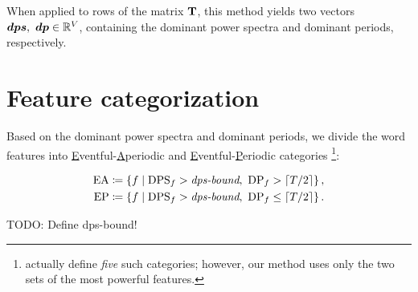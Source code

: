 When applied to rows of the matrix $\mathbf{T}$, this method yields two vectors $\vect{DPS},\ \vect{DP} \in \R^{\featcount}$, containing the dominant power spectra and dominant periods, respectively.


\section{Feature categorization}
Based on the dominant power spectra and dominant periods, we divide the word features into \underline{E}ventful-\underline{A}periodic and \underline{E}ventful-\underline{P}eriodic categories \footnote{\cite{event-detection} actually define \textit{five} such categories; however, our method uses only the two sets of the most powerful features.}:

\begin{equation}
\begin{split}
	\text{EA} \coloneqq \left\{ f \mid \text{DPS}_{f} > \textit{dps-bound},\ \text{DP}_{f} > \lceil T / 2\rceil \right\}, \\
	\text{EP} \coloneqq \left\{ f \mid \text{DPS}_{f} > \textit{dps-bound},\ \text{DP}_{f} \leq \lceil T / 2\rceil \right\}.
\end{split}
\end{equation}

{\color{red}TODO: Define dps-bound!}